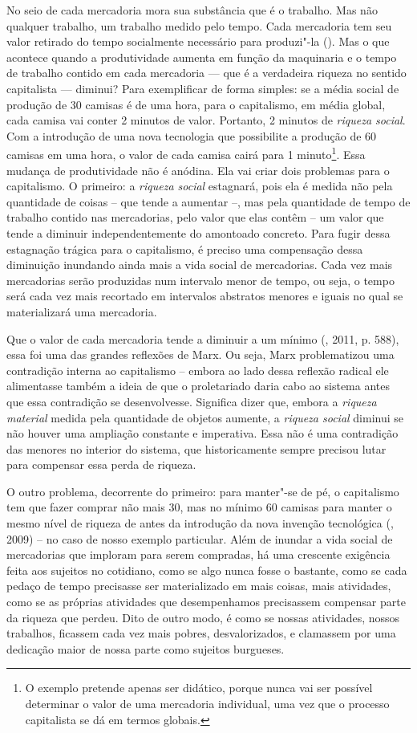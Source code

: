 No seio de cada mercadoria mora sua substância que é o trabalho. Mas não
qualquer trabalho, um trabalho medido pelo tempo. Cada mercadoria tem
seu valor retirado do tempo socialmente necessário para produzi"-la
(). Mas o que acontece quando a produtividade aumenta em
função da maquinaria e o tempo de trabalho contido em cada mercadoria
--- que é a verdadeira riqueza no sentido capitalista --- diminui? Para
exemplificar de forma simples: se a média social de produção de 30
camisas é de uma hora, para o capitalismo, em média global, cada camisa
vai conter 2 minutos de valor. Portanto, 2 minutos de \emph{riqueza
social}. Com a introdução de uma nova tecnologia que possibilite a
produção de 60 camisas em uma hora, o valor de cada camisa cairá para 1
minuto\footnote{O exemplo pretende apenas ser didático, porque nunca vai
  ser possível determinar o valor de uma mercadoria individual, uma vez
  que o processo capitalista se dá em termos globais.}. Essa mudança de
produtividade não é anódina. Ela vai criar dois problemas para o
capitalismo. O primeiro: a \emph{riqueza social} estagnará, pois ela é
medida não pela quantidade de coisas -- que tende a aumentar --, mas
pela quantidade de tempo de trabalho contido nas mercadorias, pelo valor
que elas contêm -- um valor que tende a diminuir independentemente do
amontoado concreto. Para fugir dessa estagnação trágica para o
capitalismo, é preciso uma compensação dessa diminuição inundando ainda
mais a vida social de mercadorias. Cada vez mais mercadorias serão
produzidas num intervalo menor de tempo, ou seja, o tempo será cada vez
mais recortado em intervalos abstratos menores e iguais no qual se
materializará uma mercadoria.

Que o valor de cada mercadoria tende a diminuir a um mínimo (, 2011,
p. 588), essa foi uma das grandes reflexões de Marx. Ou seja, Marx
problematizou uma contradição interna ao capitalismo -- embora ao lado
dessa reflexão radical ele alimentasse também a ideia de que o
proletariado daria cabo ao sistema antes que essa contradição se
desenvolvesse. Significa dizer que, embora a \emph{riqueza material}
medida pela quantidade de objetos aumente, a \emph{riqueza social}
diminui se não houver uma ampliação constante e imperativa. Essa não é
uma contradição das menores no interior do sistema, que historicamente
sempre precisou lutar para compensar essa perda de riqueza.

O outro problema, decorrente do primeiro: para manter"-se de pé, o
capitalismo tem que fazer comprar não mais 30, mas no mínimo 60 camisas
para manter o mesmo nível de riqueza de antes da introdução da nova
invenção tecnológica (, 2009) -- no caso de nosso exemplo
particular. Além de inundar a vida social de mercadorias que imploram
para serem compradas, há uma crescente exigência feita aos sujeitos no
cotidiano, como se algo nunca fosse o bastante, como se cada pedaço de
tempo precisasse ser materializado em mais coisas, mais atividades, como
se as próprias atividades que desempenhamos precisassem compensar parte
da riqueza que perdeu. Dito de outro modo, é como se nossas atividades, nossos trabalhos, ficassem cada vez mais pobres, desvalorizados, e clamassem por uma dedicação maior de nossa parte como sujeitos burgueses.

